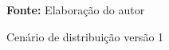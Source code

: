 \begin{figure}[ht!]
\centering

\caption{\textmd{Cenário de distribuição versão 1}}
\label{fig:cenario1}

\par\medskip\textbf{Fonte:} Elaboração do autor \par\medskip
\end{figure}

